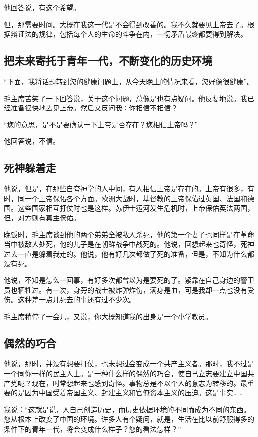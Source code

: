 他回答说，有这个希望。

但，那需要时间。大概在我这一代是不会得到改善的。我不久就要见上帝去了。根据辩证法的规律，包括每个人的生命的斗争在内，一切矛盾最终都要得到解决。

\subsection{把未来寄托于青年一代，不断变化的历史环境}

“下面，我将话题转到您的健康问题上，从今天晚上的情况来看，您好像很健康”。

毛主席苦笑了一下回答说，关于这个问题，总像是也有点疑问。他反复地说。我已经准备很快地去见上帝。然后又反问我：你相信不相信？

“您的意思，是不是要确认一下上帝是否存在？您相信上帝吗？”

他回答说，不信。

\subsection{死神躲着走}

他说，但是，在那些自夸神学的人中间，有人相信上帝是存在的。上帝有很多，有时，同一个上帝保佑各个方面。欧洲大战时，基督教的上帝保佑过英国、法国和德国。这些国家相互打仗时也是这样。苏伊士运河发生危机时，上帝保佑英法两国，但，对方则有真主保佑。

晚饭时，毛主席谈到他的两个弟弟全被敌人杀死，他的第一个妻子也同样是在革命当中被敌人处死，他的儿子是在朝鲜战争中战死的。他说，回想起来也奇怪，死神过去一直是躲着我走的。他说，他有好几次都做了死的准备，但是，不知为什么都没有死。

他说，不知是怎么一回事，有好多次都曾以为是要死的了。紧靠在自己身边的警卫员也牺牲过。有一次，身旁的战士被炸弹炸伤，满身是血，可是我却一点也没有受伤。这种差一点儿死去的事还有过不少次。

毛主席稍停了一会儿，又说，你大概知道我的出身是一个小学教员。

\subsection{偶然的巧合}

他说，那时，并没有想要打仗，也未想过会变成一个共产主义者。那时，我不过是一个同你一样的民主人士。是一种什么样的偶然的巧合，使自己立志要建立中国共产党呢？现在，时常想起来也感到奇怪。事物总是不以个人的意志为转移的。最重要的是因为中国受着帝国主义、封建主义和官僚资本主义的压迫。这是事实……

我说：“这就是说，人自己创造历史，而历史依据环境的不同而成为不同的东西。您从根本上改变了中国的环境。许多人有个疑问，就是，生活在比以前舒服得多的条件下的青年一代，将会变成什么样子？您的看法怎样？”

